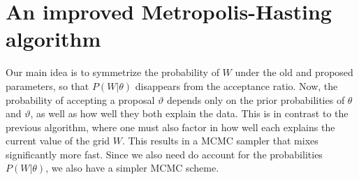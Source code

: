 
\section{An improved Metropolis-Hasting algorithm}
Our main idea is to symmetrize the probability of $W$ under the old and proposed parameters, so that $P(W|\theta)$ disappears from the acceptance ratio. 
Now, the probability of accepting a proposal $\vartheta$ depends only on the prior probabilities of $\theta$ and $\vartheta$, as well as how well they both explain the data.
This is in contrast to the previous algorithm, where one must also factor in how well each explains the current value of the grid $W$.
This results in a MCMC sampler that mixes significantly more fast. 
Since we also need do account for the probabilities $P(W|\theta)$, we also have a simpler MCMC scheme.

